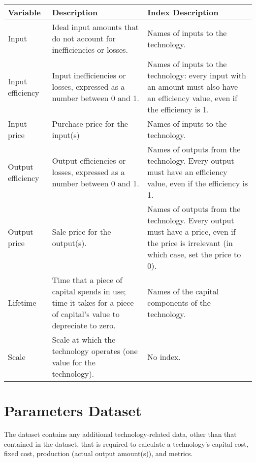 \documentclass[letterpaper,10pt,english]{sphinxmanual}
\begin{document}
\begin{savenotes}\sphinxattablestart
\centering
{}
\sphinxthecaptionisattop
{}\label{\detokenize{cheat-sheet:table-2}}\label{\detokenize{cheat-sheet:tbl-designsvars}}
\sphinxaftertopcaption
\begin{tabulary}{\linewidth}[t]{|T|T|T|}
\hline
\sphinxstyletheadfamily 
Variable
&\sphinxstyletheadfamily 
Description
&\sphinxstyletheadfamily 
Index Description
\\
\hline
Input
&
Ideal input amounts that do not account for inefficiencies or losses.
&
Names of inputs to the technology.
\\
\hline
Input efficiency
&
Input inefficiencies or losses, expressed as a number between 0 and 1.
&
Names of inputs to the technology: every input with an amount must also have an efficiency value, even if the efficiency is 1.
\\
\hline
Input price
&
Purchase price for the input(s)
&
Names of inputs to the technology.
\\
\hline
Output efficiency
&
Output efficiencies or losses, expressed as a number between 0 and 1.
&
Names of outputs from the technology. Every output must have an efficiency value, even if the efficiency is 1.
\\
\hline
Output price
&
Sale price for the output(s).
&
Names of outputs from the technology. Every output must have a price, even if the price is irrelevant (in which case, set the price to 0).
\\
\hline
Lifetime
&
Time that a piece of capital spends in use; time it takes for a piece of capital’s value to depreciate to zero.
&
Names of the capital components of the technology.
\\
\hline
Scale
&
Scale at which the technology operates (one value for the technology).
&
No index.
\\
\hline
\end{tabulary}
\par
\sphinxattableend\end{savenotes}


\section{Parameters Dataset}
\label{\detokenize{cheat-sheet:parameters-dataset}}
The  dataset contains any additional technology-related data, other than that contained in the  dataset, that is required to calculate a technology’s capital cost, fixed cost, production (actual output amount(s)), and metrics.
\end{document}
